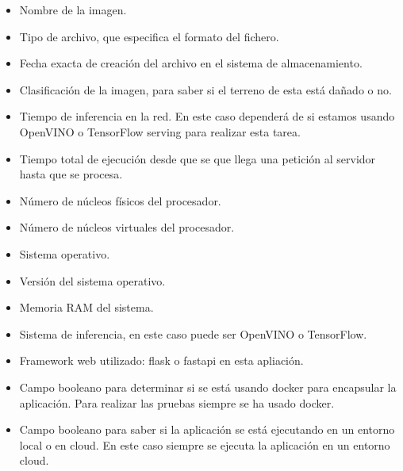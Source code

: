 \begin{itemize}
    \item Nombre de la imagen.
    \item Tipo de archivo, que especifica el formato del fichero.
    \item Fecha exacta de creación del archivo en el sistema de almacenamiento.
    \item Clasificación de la imagen, para saber si el terreno de esta está dañado o no.
    \item Tiempo de inferencia en la red.
    En este caso dependerá de si estamos usando OpenVINO o TensorFlow serving para realizar esta tarea.
    \item Tiempo total de ejecución desde que se que llega una petición al servidor hasta que se procesa.
    \item Número de núcleos físicos del procesador.
    \item Número de núcleos virtuales del procesador.
    \item Sistema operativo.
    \item Versión del sistema operativo.
    \item Memoria RAM del sistema.
    \item Sistema de inferencia, en este caso puede ser OpenVINO o TensorFlow.
    \item Framework web utilizado: flask o fastapi en esta apliación.
    \item Campo booleano para determinar si se está usando docker para encapsular la aplicación.
    Para realizar las pruebas siempre se ha usado docker.
    \item Campo booleano para saber si la aplicación se está ejecutando en un entorno local o en cloud.
    En este caso siempre se ejecuta la aplicación en un entorno cloud.
\end{itemize}


